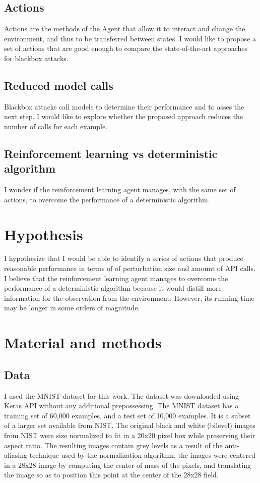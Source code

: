 \documentclass{article}
\begin{document}
\subsection{Actions}
Actions are the methods of the Agent that allow it to interact and change the environment, and thus to be transferred between states. I would like to propose a set of actions that are good enough to compare the state-of-the-art approaches for blackbox attacks.

\subsection{Reduced model calls}
Blackbox attacks call models to determine their performance and to asses the next step. I would like to explore whether the proposed approach reduces the number of calls for each example.

\subsection{Reinforcement learning vs deterministic algorithm}
I wonder if the  reinforcement learning agent manages, with the same set of actions, to overcome the performance of a deterministic algorithm.

\section{Hypothesis}
I hypothesize that I would be able to identify a series of actions that produce reasonable performance in terms of  of perturbation size and amount of API calls.\\
I believe that the reinforcement learning agent manages to overcome the performance of a deterministic algorithm because it would distill more information for the observation from the environment. However, its running time may be longer in some orders of magnitude.

\section{Material and methods}

\subsection{Data}
I used the MNIST \cite{mnist10027939599} dataset for this work. The dataset was downloaded using Keras API without any additional prepossessing. 
The MNIST dataset has a training set of 60,000 examples, and a test set of 10,000 examples. It is a subset of a larger set available from NIST. The original black and white (bilevel) images from NIST were size normalized to fit in a 20x20 pixel box while preserving their aspect ratio. The resulting images contain grey levels as a result of the anti-aliasing technique used by the normalization algorithm. the images were centered in a 28x28 image by computing the center of mass of the pixels, and translating the image so as to position this point at the center of the 28x28 field. \\
\end{document}
